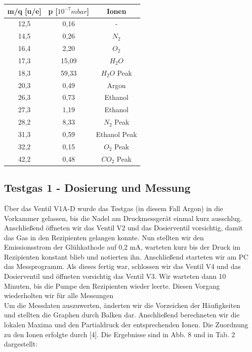 \begin{center}
\begin{tabular}{c|c|c}
m/q [u/e] & p [$10^{-7} mbar$] & Ionen\\	
\hline	
12,5 &	0,16 & - \\
14,5 &	0,26 & $N_2$\\
16,4 &	2,20 & $O_2$\\
17,3 &	15,09 & $H_2O$\\
18,3 &	59,33 & $H_2O$ Peak\\
20,3 &	0,49 & Argon\\
26,3 &	0,73 & Ethanol\\
27,3 &	1,19 & Ethanol\\
28,2 &	8,33 & $N_2$ Peak\\
31,3 &	0,59 & Ethanol Peak\\
32,2 &	0,15 & $O_2$ Peak\\
42,2 &	0,48 & $CO_2$ Peak\\
\end{tabular}
\end{center}

\subsection{Testgas 1 - Dosierung und Messung}
Über das Ventil V1A-D wurde das Testgas (in diesem Fall Argon) in die Vorkammer gelassen, bis die Nadel am Druckmessgerät einmal kurz ausschlug. Anschließend öffneten wir das Ventil V2 und das Dosierventil vorsichtig, damit das Gas in den Rezipienten gelangen konnte. Nun stellten wir den Emissionsstrom der Glühkathode auf 0,2 mA, warteten kurz bis der Druck im Rezipienten konstant blieb und notierten ihn. Anschließend starteten wir am PC das Messprogramm. Als dieses fertig war, schlossen wir das Ventil V4 und das Dosierventil und öffneten vorsichtig das Ventil V3. Wir warteten dann 10 Minuten, bis die Pumpe den Rezipienten wieder leerte. Diesen Vorgang wiederholten wir für alle Messungen\\
Um die Messdaten auszuwerten, änderten wir die Vorzeichen der Häufigkeiten und stellten die Graphen durch Balken dar. Anschließend berechneten wir die lokalen Maxima und den Partialdruck der entsprechenden Ionen. Die Zuordnung zu den Ionen erfolgte durch [4]. Die Ergebnisse sind in Abb. 8 und in Tab. 2 dargestellt:\\

